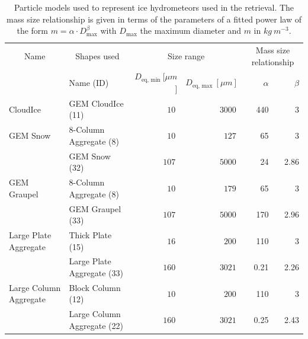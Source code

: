 \documentclass[journal abbreviation, manuscript]{copernicus}
\begin{document}
\begin{table}
  \centering
  \caption{Particle models used to represent ice hydrometeors used in the
    retrieval. The mass size relationship is given in terms of the parameters
    of a fitted power law of the form $m = \alpha \cdot D_\text{max}^\beta$ with
    $D_\text{max}$ the maximum diameter and $m$ in $\unit{kg\ m^{-3}}$.}
  \begin{tabular}{l|l|rr|rr}
    \multicolumn{1}{c|}{Name} & \multicolumn{1}{c|}{Shapes used} &
    \multicolumn{2}{c|}{Size range} & \multicolumn{2}{c}{Mass size relationship}
    \\
    & Name (ID) &$D_{\text{eq}, \text{ min}}\ [\unit{\mu m}$] &
    $D_{\text{eq}, \text{ max}}\ [\unit{\mu m}]$ &\hfill
    $\alpha$ & \hfill $\beta$ \\
    \hline \hline %
    CloudIce & GEM CloudIce (11) & $10\ $ & $3000\ $ & \hfill 440 & \hfill 3 \\
    \hline GEM Snow & 8-Column Aggregate (8) & $10\ $ & $127\ $ & \hfill 65 &
    \hfill 3 \\ & GEM Snow (32) & $107\ $ & $5000\ $ & \hfill 24 & \hfill 2.86
    \\
    \hline GEM Graupel & 8-Column Aggregate (8) & $10\ $ & $179\ $ & \hfill 65 &
    \hfill 3 \\ & GEM Graupel (33) & $107\ $ & $5000\ $ & \hfill 170 & \hfill
    2.96 \\
    \hline Large Plate Aggregate & Thick Plate (15) & $16\ $ & $200\ $ & \hfill
    110 & \hfill 3 \\ & Large Plate Aggregate (33) & $160\ $ & $3021\ $ & \hfill
    0.21 & \hfill 2.26 \\
    \hline Large Column Aggregate & Block Column (12) & $10\ $ & $200\ $ &
    \hfill 110 & \hfill 3 \\ & Large Column Aggregate (22) & $160\ $ & $3021\ $
    & \hfill 0.25 & \hfill 2.43 \\
  \end{tabular}
  \label{tab:particle_properties}
\end{table}
\end{document}
